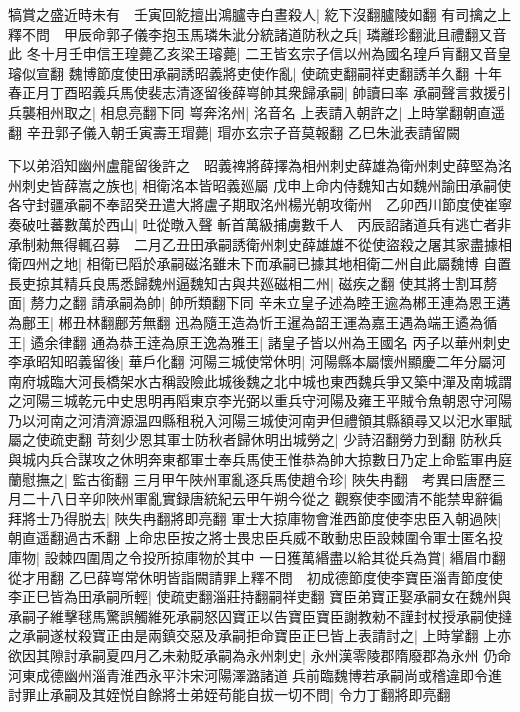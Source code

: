 犒賞之盛近時未有　壬寅回紇擅出鴻臚寺白晝殺人|{
	紇下沒翻臚陵如翻}
有司擒之上釋不問　甲辰命郭子儀李抱玉馬璘朱泚分統諸道防秋之兵|{
	璘離珍翻泚且禮翻又音此}
冬十月壬申信王瑝薨乙亥梁王璿薨|{
	二王皆玄宗子信以州為國名瑝戶肓翻又音皇璿似宣翻}
魏博節度使田承嗣誘昭義將吏使作亂|{
	使疏吏翻嗣祥吏翻誘羊久翻}
十年春正月丁酉昭義兵馬使裴志清逐留後薛㟧帥其衆歸承嗣|{
	帥讀曰率}
承嗣聲言救援引兵襲相州取之|{
	相息亮翻下同}
㟧奔洺州|{
	洺音名}
上表請入朝許之|{
	上時掌翻朝直遥翻}
辛丑郭子儀入朝壬寅壽王瑁薨|{
	瑁亦玄宗子音莫報翻}
乙巳朱泚表請留闕

下以弟滔知幽州盧龍留後許之　昭義禆將薛擇為相州刺史薛雄為衛州刺史薛堅為洺州刺史皆薛嵩之族也|{
	相衛洺本皆昭義廵屬}
戊申上命内侍魏知古如魏州諭田承嗣使各守封疆承嗣不奉詔癸丑遣大將盧子期取洺州楊光朝攻衛州　乙卯西川節度使崔寧奏破吐蕃數萬於西山|{
	吐從暾入聲}
斬首萬級捕虜數千人　丙辰詔諸道兵有逃亡者非承制勑無得輒召募　二月乙丑田承嗣誘衛州刺史薛雄雄不從使盜殺之屠其家盡據相衛四州之地|{
	相衛已䧟於承嗣磁洺雖未下而承嗣已據其地相衛二州自此屬魏博}
自置長吏掠其精兵良馬悉歸魏州逼魏知古與共廵磁相二州|{
	磁疾之翻}
使其將士割耳剺面|{
	剺力之翻}
請承嗣為帥|{
	帥所類翻下同}
辛未立皇子述為睦王逾為郴王連為恩王遘為鄜王|{
	郴丑林翻鄜芳無翻}
迅為隨王造為忻王暹為韶王運為嘉王遇為端王遹為循王|{
	遹余律翻}
通為恭王逹為原王逸為雅王|{
	諸皇子皆以州為王國名}
丙子以華州刺史李承昭知昭義留後|{
	華戶化翻}
河陽三城使常休明|{
	河陽縣本屬懷州顯慶二年分屬河南府城臨大河長橋架水古稱設險此城後魏之北中城也東西魏兵爭又築中潬及南城謂之河陽三城乾元中史思明再䧟東京李光弼以重兵守河陽及雍王平賊令魚朝恩守河陽乃以河南之河清濟源温四縣租税入河陽三城使河南尹但禮領其縣額尋又以汜水軍賦屬之使疏吏翻}
苛刻少恩其軍士防秋者歸休明出城勞之|{
	少詩沼翻勞力到翻}
防秋兵與城内兵合謀攻之休明奔東都軍士奉兵馬使王惟恭為帥大掠數日乃定上命監軍冉庭蘭慰撫之|{
	監古銜翻}
三月甲午陜州軍亂逐兵馬使趙令珍|{
	陜失冉翻　考異曰唐歷三月二十八日辛卯陜州軍亂實録唐統紀云甲午朔今從之}
觀察使李國清不能禁卑辭徧拜將士乃得脱去|{
	陜失冉翻將即亮翻}
軍士大掠庫物會淮西節度使李忠臣入朝過陜|{
	朝直遥翻過古禾翻}
上命忠臣按之將士畏忠臣兵威不敢動忠臣設棘圍令軍士匿名投庫物|{
	設棘四圍周之令投所掠庫物於其中}
一日獲萬緡盡以給其從兵為賞|{
	緡眉巾翻從才用翻}
乙巳薛㟧常休明皆詣闕請罪上釋不問　初成德節度使李寶臣淄青節度使李正巳皆為田承嗣所輕|{
	使疏吏翻淄莊持翻嗣祥吏翻}
寶臣弟寶正娶承嗣女在魏州與承嗣子維擊毬馬驚誤觸維死承嗣怒囚寶正以告寶臣寶臣謝教勑不謹封杖授承嗣使撻之承嗣遂杖殺寶正由是兩鎮交惡及承嗣拒命寶臣正巳皆上表請討之|{
	上時掌翻}
上亦欲因其隙討承嗣夏四月乙未勑貶承嗣為永州刺史|{
	永州漢零陵郡隋廢郡為永州}
仍命河東成德幽州淄青淮西永平汴宋河陽澤潞諸道兵前臨魏博若承嗣尚或稽違即令進討罪止承嗣及其姪悦自餘將士弟姪苟能自拔一切不問|{
	令力丁翻將即亮翻}
